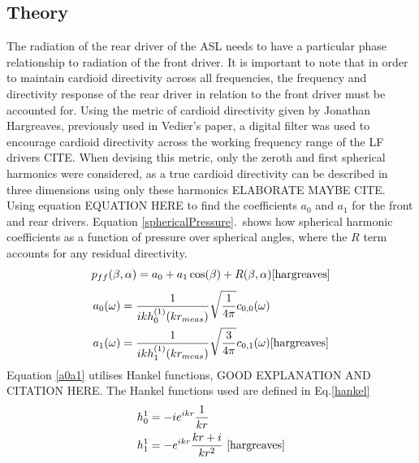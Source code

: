 \documentclass{report}
\begin{document}
        \subsection{Theory}
            The radiation of the rear driver of the ASL needs to have a particular phase relationship to radiation of the front driver.
            It is important to note that in order to maintain cardioid directivity across all frequencies, the frequency and directivity response of the rear driver in relation to the front driver must be accounted for.
            Using the metric of cardioid directivity given by Jonathan Hargreaves, previously used in Vedier's paper, a digital filter was used to encourage cardioid directivity across the working frequency range of the LF drivers CITE.
            When devising this metric, only the zeroth and first spherical harmonics were considered, as a true cardioid directivity can be described in three dimensions using only these harmonics ELABORATE MAYBE CITE.
            Using equation EQUATION HERE to find the coefficients $a_0$ and $a_1$ for the front and rear drivers.
            Equation \ref{sphericalPressure}.\ shows how spherical harmonic coefficients as a function of pressure over spherical angles, where the $R$ term accounts for any residual directivity.
            \begin{equation}
                p_{ff}(\beta,\alpha) = a_0 + a_1 \cos(\beta) + R(\beta,\alpha)
                \label{sphericalPressure}
                \cite{hargreaves}
            \end{equation}
            \begin{equation}
                \begin{split}
                    a_0(\omega) &= \frac{1}{ikh_0^{(1)}(kr_{meas})} \sqrt{\frac{1}{4\pi}} c_{0,0}(\omega) \\
                    a_1(\omega) &= \frac{1}{ikh_1^{(1)}(kr_{meas})} \sqrt{\frac{3}{4\pi}} c_{0,1}(\omega)
                    \label{a0a1}
                    \cite{hargreaves}
                \end{split}
            \end{equation}
            Equation \ref{a0a1} utilises Hankel functions, GOOD EXPLANATION AND CITATION HERE.
            The Hankel functions used are defined in Eq.\ref{hankel}
            \begin{equation}
                \begin{split}
                    h_0^1 &= -i  e^{ikr}  \frac{1}{kr} \\
                    h_1^1 &= -e^{ikr}  \frac{kr + i}{kr^2} ~\cite{hargreaves}
                    \label{hankel}
                \end{split}
            \end{equation}
\end{document}

